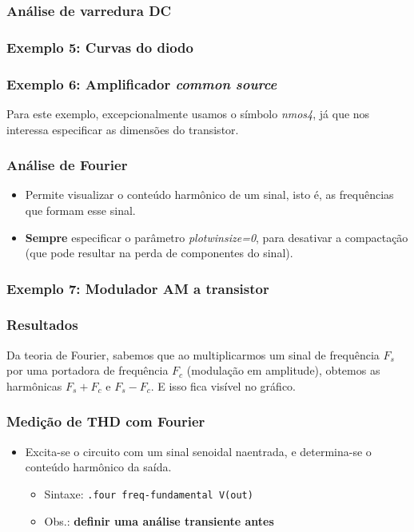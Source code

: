 \documentclass{beamer}
\begin{document}
\begin{frame}
\frametitle{Análise de varredura DC}
\end{frame}

\begin{frame}
\frametitle{Exemplo 5: Curvas do diodo}
\end{frame}

\begin{frame}
\frametitle{Exemplo 6: Amplificador \textit{common source}}
Para este exemplo, excepcionalmente usamos o símbolo \textit{nmos4}, já que nos interessa especificar as dimensões do transistor.
\end{frame}

\begin{frame}
\frametitle{Análise de Fourier}
\begin{itemize}
\item Permite visualizar o conteúdo harmônico de um sinal, isto é, as frequências que formam esse sinal.
\item \textbf{Sempre} especificar o parâmetro \textit{plotwinsize=0}, para desativar a compactação (que pode resultar na perda de componentes do sinal).
\end{itemize}
\end{frame}

\begin{frame}
\frametitle{Exemplo 7: Modulador AM a transistor}
\end{frame}

\begin{frame}
\frametitle{Resultados}
Da teoria de Fourier, sabemos que ao multiplicarmos um sinal de frequência $F_s$ por uma portadora de frequência $F_c$ (modulação em amplitude), obtemos as harmônicas $F_s + F_c$ e $F_s - F_c$. E isso fica visível no gráfico.
\end{frame}

\begin{frame}
\frametitle{Medição de THD com Fourier}
\begin{itemize}
\item Excita-se o circuito com um sinal senoidal naentrada, e determina-se o conteúdo harmônico da saída.
\begin{itemize}
\item Sintaxe: \texttt{.four freq-fundamental V(out)}
\item Obs.: \textbf{definir uma análise transiente antes}
\end{itemize}
\end{itemize}
\end{frame}
\end{document}
